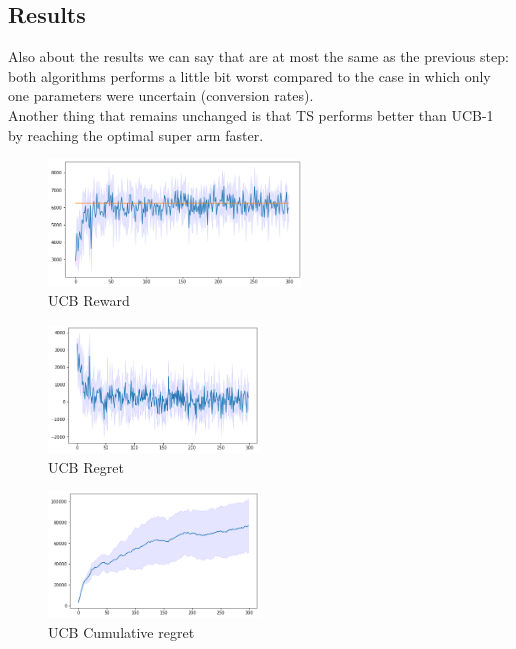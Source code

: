 \subsection{Results}
Also about the results we can say that are at most the same as the previous step: both algorithms performs a little bit worst compared to the case in which only one parameters were uncertain (conversion rates).\\ Another thing that remains unchanged is that TS performs better than UCB-1 by reaching the optimal super arm faster.
\begin{figure}[ht]
    \begin{center}
    \includegraphics[width=0.6\textwidth]{img/ucb_reward5.png}
    \caption{UCB Reward}
    \label{fig:reward51}
    \end{center}
\end{figure}
\begin{multicols}{2}
    \begin{figure}[H]
        \begin{center}
        \includegraphics[width=0.5\textwidth]{img/ucb_regret5.png}
        \caption{UCB Regret}
        \label{fig:regret51}
        \end{center}
    \end{figure}
    \columnbreak
    \begin{figure}[H]
        \begin{center}
        \includegraphics[width=0.5\textwidth]{img/ucb_cum_regret5.png}
        \caption{UCB Cumulative regret}
        \label{fig:cum_reg51}
        \end{center}
    \end{figure}
\end{multicols}
